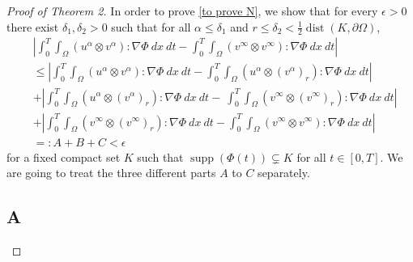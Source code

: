 \documentclass{amsart}
\begin{document}
\begin{proof}[Proof of Theorem 2]
In order to prove \eqref{to prove N}, we show that for every $\epsilon>0$ there exist $\delta_1,\delta_2>0$ such that for all $\alpha \leq \delta_1$ and $r\leq \delta_2 <\frac{1}{2} \operatorname{dist}(K,\partial\Omega)$,
\begin{equation*}
\begin{aligned}
 &\left| \int_0^T \int_{\Omega} (u^{\alpha} \otimes v^{\alpha}) : \nabla \Phi \ dx \ dt - \int_0^T \int_{\Omega} (v^{\infty} \otimes v^{\infty}) : \nabla \Phi \ dx \ dt \right| \\
 &\leq \left| \int_0^T \int_{\Omega} (u^{\alpha} \otimes v^{\alpha}) : \nabla \Phi \ dx \ dt - \int_0^T \int_{\Omega} \left(u^{\alpha}\otimes (v^{\alpha})_r\right) : \nabla \Phi \ dx \ dt \right| \\
&+ \left| \int_0^T \int_{\Omega} \left(u^{\alpha} \otimes (v^{\alpha})_r\right) : \nabla \Phi \ dx \ dt - \ \int_0^T \int_{\Omega} \left(v^{\infty} \otimes (v^{\infty})_r\right) : \nabla \Phi \ dx \ dt \right|\\
& + \left| \int_0^T \int_{\Omega} \left(v^{\infty} \otimes (v^{\infty})_r\right) : \nabla \Phi \ dx \ dt - \int_0^T \int_{\Omega} (v^{\infty} \otimes v^{\infty}) : \nabla \Phi \ dx \ dt \right|\\
& =: A + B+C < \epsilon
\end{aligned}
\end{equation*}
for a fixed compact set $K$ such that $\operatorname{supp}(\Phi(t)) \subsetneq K$ for all $t \in [0,T]$. We are going to treat the three different parts $A$ to $C$ separately. 

\subsection*{A}


\end{proof}
\end{document}
